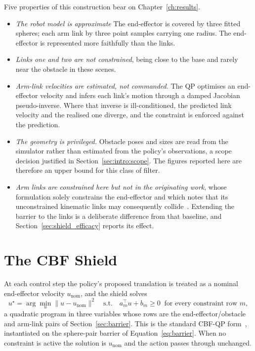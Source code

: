 \documentclass[a4paper,11pt]{report}
\begin{document}
Five properties of this construction bear on Chapter~\ref{ch:results}.

\begin{itemize}
  \item \emph{The robot model is approximate} The end-effector is covered by
  three fitted spheres; each arm link by three point samples carrying one radius. The end-effector
  is represented more faithfully than the links.

  \item \emph{Links one and two are not constrained}, being close to the base and rarely
  near the obstacle in these scenes.

  \item \emph{Arm-link velocities are estimated, not commanded.} The QP optimises an
  end-effector velocity and infers each link's motion through a damped Jacobian pseudo-inverse.
  Where that inverse is ill-conditioned, the predicted
  link velocity and the realised one diverge, and the constraint is enforced against the
  prediction.

  \item \emph{The geometry is privileged.} Obstacle poses and sizes are read from the simulator
  rather than estimated from the policy's observations, a scope decision justified in
  Section~\ref{sec:intro:scope}. The figures reported here are therefore an upper bound for this
  class of filter.


  \item \emph{Arm links are constrained here but not in the originating work}, whose formulation
  solely constrains the end-effector and which notes that its unconstrained kinematic links may
  consequently collide~\cite{vlsa2026}. Extending the barrier to the links is a deliberate
  difference from that baseline, and Section~\ref{sec:shield_efficacy} reports its effect.
\end{itemize}

\section{The CBF Shield}\label{sec:shield}

At each control step the policy's proposed translation is treated as a nominal end-effector
velocity $u_{\mathrm{nom}}$, and the shield solves
\begin{equation}
  u^{\star} = \arg\min_{u} \lVert u - u_{\mathrm{nom}} \rVert^{2}
  \quad \text{s.t.} \quad
  a_m^{\top} u + b_m \ge 0 \;\; \text{for every constraint row } m,
  \label{eq:shield_qp}
\end{equation}
a quadratic program in three variables whose rows are the end-effector/obstacle and arm-link pairs
of Section~\ref{sec:barrier}. This is the standard CBF-QP form~\cite{ames2017cbf}, instantiated on
the sphere-pair barrier of Equation~\ref{eq:barrier}. When no constraint is active the solution is $u_{\mathrm{nom}}$ and the action passes through unchanged.
\end{document}
